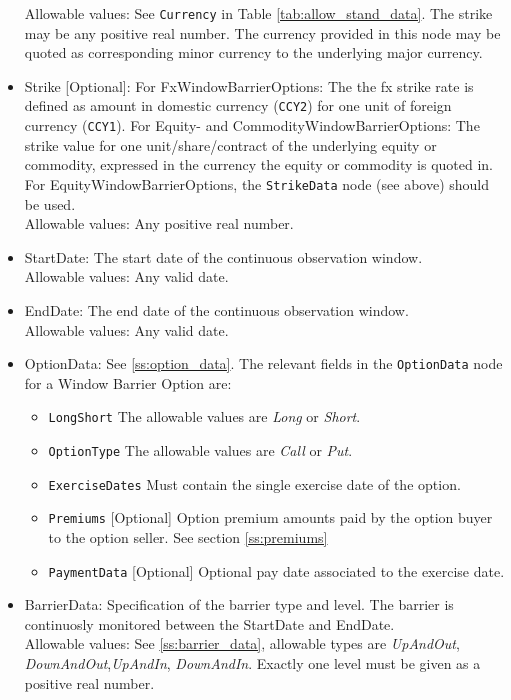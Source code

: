 \begin{itemize}
Allowable values: See \lstinline!Currency! in Table \ref{tab:allow_stand_data}. The strike may be any positive real
number. The currency provided in this node may be quoted as corresponding minor currency to the underlying major
currency.

\item Strike [Optional]: For FxWindowBarrierOptions: The the fx strike rate is defined as amount in domestic currency
  (\lstinline!CCY2!) for one unit of foreign currency (\lstinline!CCY1!). For Equity- and CommodityWindowBarrierOptions: The
  strike value for one unit/share/contract of the underlying equity or commodity, expressed in the currency the equity
  or commodity is quoted in. For EquityWindowBarrierOptions, the \lstinline!StrikeData! node (see above) should be used. \\

Allowable values: Any positive real number.

\item StartDate: The start date of the continuous observation window.\\

Allowable values: Any valid date.

\item EndDate: The end date of the continuous observation window.\\

Allowable values: Any valid date.

\item OptionData: See \ref{ss:option_data}. The relevant fields in the \lstinline!OptionData! node for a Window Barrier Option are:

\begin{itemize}
\item \lstinline!LongShort! The allowable values are \emph{Long} or \emph{Short}.
\item \lstinline!OptionType! The allowable values are \emph{Call} or \emph{Put}.
\item \lstinline!ExerciseDates! Must contain the single exercise date of the option.
\item \lstinline!Premiums! [Optional] Option premium amounts paid by the option buyer to the option seller. See section \ref{ss:premiums}
\item \lstinline!PaymentData! [Optional] Optional pay date associated to the exercise date.
\end{itemize}

\item BarrierData: Specification of the barrier type and level. The barrier is continuosly monitored between the
  StartDate and EndDate. \\

Allowable values: See \ref{ss:barrier_data}, allowable types are \emph{UpAndOut}, \emph{DownAndOut},\emph{UpAndIn},
\emph{DownAndIn}. Exactly one level must be given as a positive real number.

\end{itemize}

